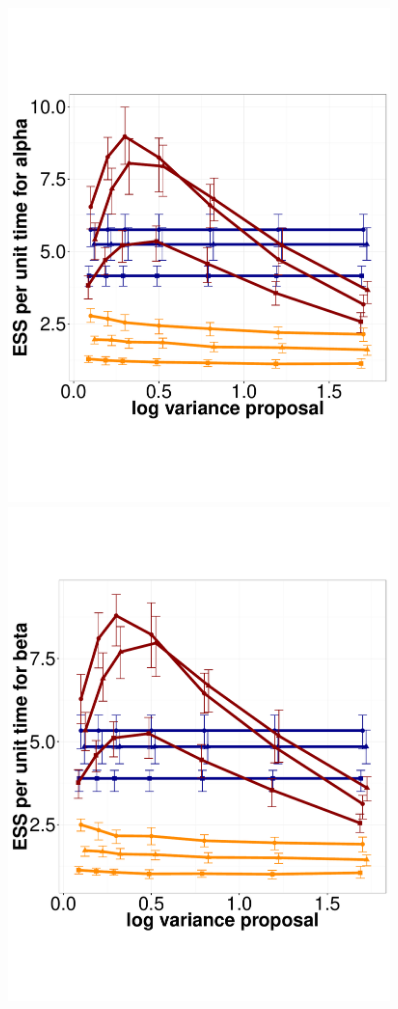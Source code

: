   \begin{figure}%
  \centering
  \begin{minipage}[hp]{0.45\linewidth}
  \centering
    \includegraphics [width=0.90\textwidth, angle=0]{figs/q_3_alpha.pdf}
      \end{minipage}
  \begin{minipage}[hp]{0.45\linewidth}
  \centering
    \includegraphics [width=0.90\textwidth, angle=0]{figs/q_3_beta.pdf}

\end{minipage}
\end{figure}
